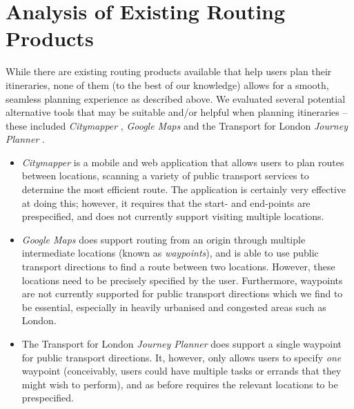 \documentclass[a4paper, 10pt]{report}
\begin{document}
\section{Analysis of Existing Routing Products}
While there are existing routing products available that help users plan their itineraries, none of them (to the best of our knowledge) allows for a smooth, seamless planning experience as described above. We evaluated several potential alternative tools that may be suitable and/or helpful when planning itineraries -- these included \textit{Citymapper} \cite{citymapper}, \textit{Google Maps} \cite{google-maps} and the Transport for London \textit{Journey Planner} \cite{tfl-journey-planner}.
\begin{itemize}
\item \textit{Citymapper} is a mobile and web application that allows users to plan routes between locations, scanning a variety of public transport services to determine the most efficient route. The application is certainly very effective at doing this; however, it requires that the start- and end-points are prespecified, and does not currently support visiting multiple locations.
\item \textit{Google Maps} does support routing from an origin through multiple intermediate locations (known as \textit{waypoints}), and is able to use public transport directions to find a route between two locations. However, these locations need to be precisely specified by the user. Furthermore, waypoints are not currently supported for public transport directions \cite{gmaps-no-dir} which we find to be essential, especially in heavily urbanised and congested areas such as London. 
\item The Transport for London \textit{Journey Planner} does support a single waypoint for public transport directions. It, however, only allows users to specify \textit{one} waypoint (conceivably, users could have multiple tasks or errands that they might wish to perform), and as before requires the relevant locations to be prespecified.
\end{itemize}
\end{document}

